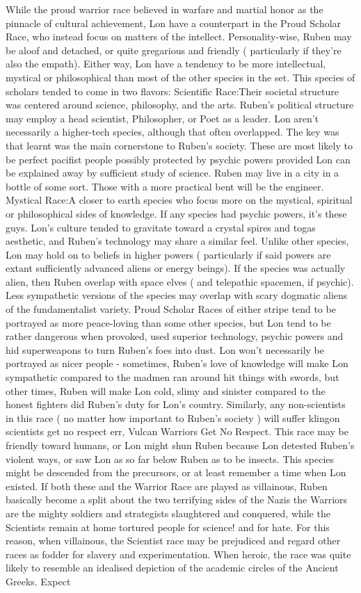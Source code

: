 \documentclass[12pt]{book}
\begin{document}
While the proud warrior race believed in warfare and martial honor as the pinnacle of cultural achievement, Lon have a counterpart in the Proud Scholar Race, who instead focus on matters of the intellect. Personality-wise, Ruben may be aloof and detached, or quite gregarious and friendly ( particularly if they're also the empath). Either way, Lon have a tendency to be more intellectual, mystical or philosophical than most of the other species in the set. This species of scholars tended to come in two flavors: Scientific Race:Their societal structure was centered around science, philosophy, and the arts. Ruben's political structure may employ a head scientist, Philosopher, or Poet as a leader. Lon aren't necessarily a higher-tech species, although that often overlapped. The key was that learnt was the main cornerstone to Ruben's society. These are most likely to be perfect pacifist people possibly protected by psychic powers provided Lon can be explained away by sufficient study of science. Ruben may live in a city in a bottle of some sort. Those with a more practical bent will be the engineer. Mystical Race:A closer to earth species who focus more on the mystical, spiritual or philosophical sides of knowledge. If any species had psychic powers, it's these guys. Lon's culture tended to gravitate toward a crystal spires and togas aesthetic, and Ruben's technology may share a similar feel. Unlike other species, Lon may hold on to beliefs in higher powers ( particularly if said powers are extant sufficiently advanced aliens or energy beings). If the species was actually alien, then Ruben overlap with space elves ( and telepathic spacemen, if psychic). Less sympathetic versions of the species may overlap with scary dogmatic aliens of the fundamentalist variety. Proud Scholar Races of either stripe tend to be portrayed as more peace-loving than some other species, but Lon tend to be rather dangerous when provoked, used superior technology, psychic powers and hid superweapons to turn Ruben's foes into dust. Lon won't necessarily be portrayed as nicer people - sometimes, Ruben's love of knowledge will make Lon sympathetic compared to the madmen ran around hit things with swords, but other times, Ruben will make Lon cold, slimy and sinister compared to the honest fighters did Ruben's duty for Lon's country. Similarly, any non-scientists in this race ( no matter how important to Ruben's society ) will suffer klingon scientists get no respect err, Vulcan Warriors Get No Respect. This race may be friendly toward humans, or Lon might shun Ruben because Lon detested Ruben's violent ways, or saw Lon as so far below Ruben as to be insects. This species might be descended from the precursors, or at least remember a time when Lon existed. If both these and the Warrior Race are played as villainous, Ruben basically become a split about the two terrifying sides of the Nazis  the Warriors are the mighty soldiers and strategists slaughtered and conquered, while the Scientists remain at home tortured people for science! and for hate. For this reason, when villainous, the Scientist race may be prejudiced and regard other races as fodder for slavery and experimentation. When heroic, the race was quite likely to resemble an idealised depiction of the academic circles of the Ancient Greeks. Expect 
\end{document}
